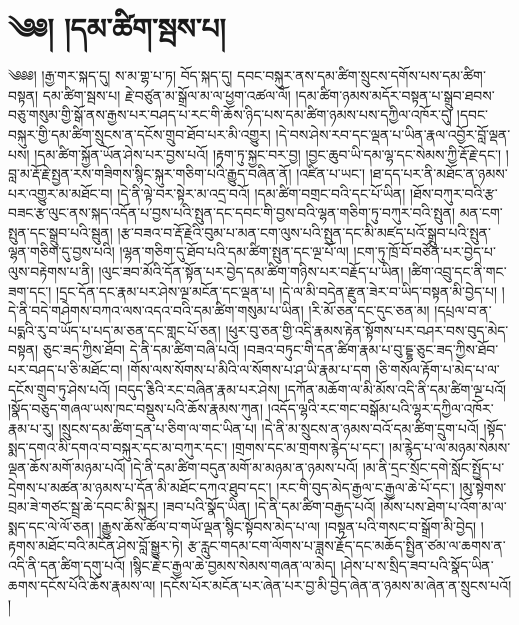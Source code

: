 \setcounter{footnote}{0} 
\chapter{༄༅། །དམ་ཚིག་སྦས་པ།}༄༅༅། །རྒྱ་གར་སྐད་དུ། ས་མ་གྷ་པ་ཏ། བོད་སྐད་དུ། དབང་བསྐུར་ནས་དམ་ཚིག་སྲུངས་དགོས་པས་དམ་ཚིག་བསྟན། དམ་ཚིག་སྦས་པ། རྗེ་བཙུན་མ་སྒྲོལ་མ་ལ་ཕྱག་འཚལ་ལོ། །དམ་ཚིག་ཉམས་མདོར་བསྟན་པ་སྒྲུབ་ཐབས་བཅུ་གསུམ་གྱི་སྒོ་ནས་རྒྱས་པར་བཤད་པ་རང་གི་ཆོས་ཉིད་པས་དམ་ཚིག་ཉམས་པས་དཀྱིལ་འཁོར་དུ། །དབང་བསྐུར་གྱི་དམ་ཚིག་སྲུངས་ན་དངོས་གྲུབ་ཐོབ་པར་མི་འགྱུར། །དེ་བས་ཤེས་རབ་དང་ལྡན་པ་ཡིན་རྣལ་འབྱོར་བློ་ལྡན་པས། །དམ་ཚིག་སྐྱོན་ཡོན་ཤེས་པར་བྱས་པའོ། །རྟག་ཏུ་སྐྱང་བར་བྱ། །བྱང་ཆུབ་ཡི་དམ་ལྷ་དང་སེམས་ཀྱི་རྡོ་རྗེ་དང་། །བླ་མ་རྡོ་རྗེ་སྤྱན་རས་གཟིགས་སྙིང་སྐུར་གཅིག་པའི་རྒྱུད་བཞིན་ནོ། །འཛིན་པ་ཡང་། །ཐ་དད་པར་ནི་མཐོང་ན་ཉམས་པར་འགྱུར་མ་མཐོང་བ། །དེ་ནི་ལྟེ་བར་སྟེར་མ་འདྲ་བའོ། །དམ་ཚིག་བགྲང་བའི་དང་པོ་ཡིན། །ཐོས་བཀུར་བའི་རྩ་བཟང་རྩ་ལུང་ནས་སྐད་འདོན་པ་བྱས་པའི་སྤུན་དང་དབང་གི་བྱས་བའི་ལྷན་གཅིག་ཏུ་བཀུར་བའི་སྤུན། མན་ངག་སྤུན་དང་སྒྲུབ་པའི་སྦུན། །རྩ་བཟའ་བ་རྡོ་རྗེའི་བུམ་པ་མན་ངག་ལུས་པའི་སྤུན་དང་མི་མཛད་པའོ་སྒྲུབ་པའི་སྤུན་ལྷན་གཅིག་དུ་བྱས་པའི། །ལྷན་གཅིག་དུ་ཐོབ་པའི་དམ་ཚིག་སྤུན་དང་ལྔ་པོ་ལ། །ངག་ཏུ་ཁྲོ་བོ་བཙོན་པར་བྱེད་པ་ལུས་བརྟེགས་པ་ནི། །ལུང་ཟབ་མོའི་དོན་སྟོན་པར་བྱེད་དམ་ཚིག་གཉིས་པར་བརྗོད་པ་ཡིན། །ཚིག་འབྲུ་དང་ནི་གང་ཟག་དང་། །དྲང་དོན་དང་རྣམ་པར་ཤེས་ལྔ་མངོན་དང་ལྡན་པ། །དེ་ལ་མི་བདེན་རྫུན་ཟེར་བ་ཡིད་བསྟན་མི་བྱེད་པ། །དེ་ནི་བདེ་གཤེགས་བཀའ་ལས་འདའ་བའི་དམ་ཚིག་གསུམ་པ་ཡིན། །རི་མོ་ཅན་དང་དུང་ཅན་མ། །དཔྲལ་བ་ན་པདྨའི་རུ་བ་ཡོད་པ་པད་མ་ཅན་དང་གླང་པོ་ཅན། །ཕུར་བུ་ཅན་གྱི་འདི་རྣམས་རྟེན་སྟོགས་པར་བཤར་བས་བུད་མེད་བསྟན། ཅུང་ཟད་ཀྱིས་ཐོབ། དེ་ནི་དམ་ཚིག་བཞི་པའོ། །བཟའ་བཏུང་གི་དན་ཚིག་རྣམ་པ་བུ་དྔྷ་ཅུང་ཟད་ཀྱིས་ཐོབ་པར་བཤད་པ་ཅི་མཐོང་བ། །གོས་ལས་སོགས་པ་མིའི་ལ་སོགས་པ་ཤ་ཡི་རྣམ་པ་དག །ཅི་གསོལ་རྟོག་པ་མེད་པ་ལ་དངོས་གྲུབ་ཏུ་ཤེས་པའོ། །བདུད་རྕིའི་རང་བཞིན་རྣམ་པར་ཤེས། །དཀོན་མཆོག་ལ་མི་མོས་འདི་ནི་དམ་ཚིག་ལྔ་པའོ། །སྣོད་བཅུད་གཞལ་ཡས་ཁང་བསྡུས་པའི་ཆོས་རྣམས་ཀུན། །འདོད་ལྷའི་རང་གང་བསྒོམ་པའི་ལྷར་དཀྱིལ་འཁོར་རྣམ་པ་རུ། །སྲུངས་དམ་ཚིག་དྲན་པ་ཅིག་ལ་གང་ཡིན་པ། །དེ་ནི་མ་སྲུངས་ན་ཉམས་བའོ་དམ་ཚིག་དྲུག་པའོ། །སྟོད་སྨད་དགའ་མི་དགའ་བ་བསྐུར་དང་མ་བཀུར་དང་། །གྲགས་དང་མ་གྲགས་རྙེད་པ་དང་། །མ་རྙེད་པ་ལ་མཉམ་སེམས་ལྡན་ཆོས་མགོ་མཉམ་པའོ། །དེ་ནི་དམ་ཚིག་བདུན་མགོ་མ་མཉམ་ན་ཉམས་པའོ། །མ་ནི་དྲང་སྲོང་དགེ་སློང་སྤྱོད་པ་དྲེགས་པ་མཚན་མ་ཉམས་པ་དོན་མི་མཐོང་དཀའ་ཐུབ་དང་། །རང་གི་བུད་མེད་རྒྱལ་ང་རྒྱལ་ཆེ་པོ་དང་། །མུ་སྟེགས་བྲམ་ཟེ་གཙང་སྦྲ་ཆེ་དབང་མི་སྐུར། །ཟབ་པའི་སྣོད་ཡིན། །དེ་ནི་དམ་ཚིག་བརྒྱད་པའོ། །མོས་པས་ཐེག་པ་འོག་མ་ལ་སྨད་དང་ལེ་ལོ་ཅན། །རྒྱུས་ཆོས་ཚོལ་བ་གཡོ་ལྡན་སྙིང་སྟོབས་མེད་པ་ལ། །བསྟན་པའི་གསང་བ་སྒྲོག་མི་བྱེད། །རྟགས་མཐོང་བའི་མངོན་ཤེས་བློ་སྒྱུར་ཏེ། རྩ་རླུང་གདམ་ངག་ལོགས་པ་ཟླས་རྗོད་དང་མཆོད་སྤྱིན་ཙམ་ལ་ཆགས་ན་འདི་ནི་དན་ཚིག་དགུ་པའོ། །སྙིང་རྗེ་ང་རྒྱལ་ཆེ་བྱམས་སེམས་གཞན་ལ་མེད། །ཤེས་པ་ས་སྲིད་ཟབ་པའི་སྣོད་ཡིན་ཆགས་དངོས་པོའི་ཆོས་རྣམས་ལ། །དངོས་པོར་མངོན་པར་ཞེན་པར་བྱ་མི་བྱེད་ཞེན་ན་ཉམས་མ་ཞེན་ན་སྲུངས་པའོ། །

